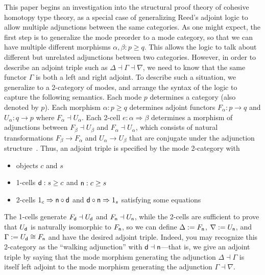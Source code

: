 \documentclass{drl-common/llncs}
\newcommand{\la}{\ensuremath{\dashv}}
\newcommand{\tc}[2]{\ensuremath{#1 \Rightarrow #2}}
\newcommand\compo[2]{\ensuremath{#1 \circ #2}}
\begin{document}
This paper begins an investigation into the structural proof theory of
cohesive homotopy type theory, as a special case of generalizing Reed's
adjoint logic to allow multiple adjunctions between the same categories.
As one might expect, the first step is to generalize the mode preorder
to a mode category, so that we can have multiple different morphisms
$\alpha, \beta : p\ge q$.  This allows the logic to talk about different
but unrelated adjunctions between two categories.  However, in order to
describe an adjoint triple such as $\Delta \la \Gamma \la \nabla$, we
need to know that the same functor $\Gamma$ is both a left and right
adjoint.  To describe such a situation, we generalize to a 2-category of
modes, and arrange the syntax of the logic to capture the following
semantics.  Each mode $p$ determines a category (also denoted by $p$).
Each morphism $\alpha : p \ge q$ determines adjoint functors $F_\alpha :
p \to q$ and $U_\alpha : q \to p$ where $F_\alpha \la U_\alpha$.  Each
2-cell $e : \tc \alpha \beta$ determines a morphism of adjunctions
between $F_\beta \la U_\beta$ and $F_\alpha \la U_\alpha$, which
consists of natural transformations ${F_\beta} \to {F_\alpha}$ and
${U_\alpha} \to {U_\beta}$ that are conjugate under the adjunction
structure~\citep[\S IV.7]{maclane98working}.  Thus, an adjoint
triple is specified by the mode 2-category with
\begin{itemize}
\item objects $c$ and $s$
\item 1-cells $\mathsf{d} : s \ge c$ and $\mathsf{n} : c \ge s$
\item 2-cells $\tc {1_c} {\compo{\dsd{n}}{\dsd{d}}}$ 
and $\tc {\compo{\dsd{d}}{\dsd{n}}} {1_s}$ satisfying 
some equations
\end{itemize}
The 1-cells generate $F_{\dsd d} \la U_{\dsd d}$ and $F_{\dsd n} \la
U_{\dsd n}$, while the 2-cells are sufficient to prove that $U_{\mathsf{d}}$ is
naturally isomorphic to $F_{\mathsf{n}}$, so we can define $\Delta :=
F_{\mathsf{n}}$, $\nabla := U_{\mathsf{n}}$, and $\Gamma := U_{\mathsf{d}} \cong F_{\mathsf{n}}$
and have the desired adjoint triple.  Indeed, you may recognize this
2-category as the ``walking adjunction'' with $\dsd d \la \dsd n$---that
is, we give an adjoint triple by saying that the mode morphism generating
the adjunction $\Delta\la \Gamma$ is itself left adjoint to the mode morphism generating the
adjunction $\Gamma\la\nabla$.
\end{document}
